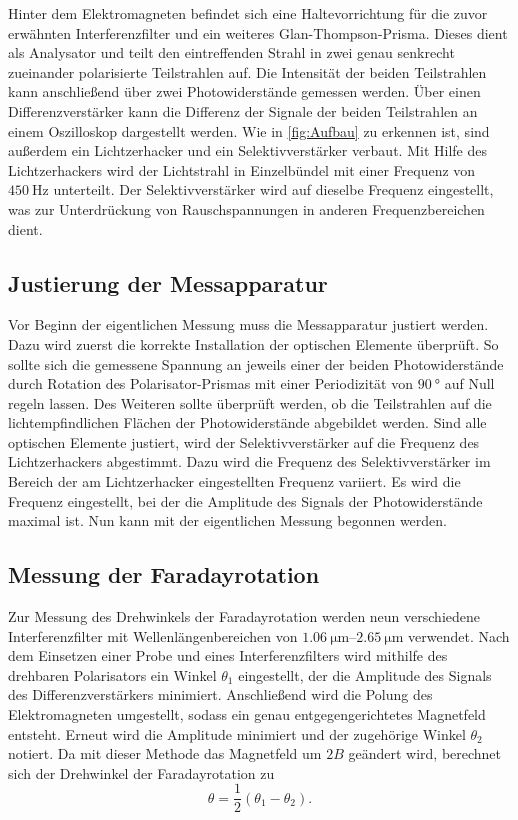 Hinter dem Elektromagneten befindet sich eine Haltevorrichtung für die zuvor erwähnten Interferenzfilter und ein weiteres Glan-Thompson-Prisma. Dieses dient als 
Analysator und teilt den eintreffenden Strahl in zwei genau senkrecht zueinander polarisierte Teilstrahlen auf. Die Intensität der beiden Teilstrahlen kann anschließend 
über zwei Photowiderstände gemessen werden. Über einen Differenzverstärker kann die Differenz der Signale der beiden Teilstrahlen an einem 
Oszilloskop dargestellt werden. Wie in \autoref{fig:Aufbau} zu erkennen ist, sind außerdem ein \glqq Lichtzerhacker\grqq{} und ein Selektivverstärker verbaut. 
Mit Hilfe des Lichtzerhackers wird der Lichtstrahl in Einzelbündel mit einer Frequenz von $\qty{450}{\hertz}$ unterteilt. Der Selektivverstärker wird auf dieselbe 
Frequenz eingestellt, was zur Unterdrückung von Rauschspannungen in anderen Frequenzbereichen dient.

\subsection{Justierung der Messapparatur}
Vor Beginn der eigentlichen Messung muss die Messapparatur justiert werden. Dazu wird zuerst die korrekte Installation der optischen Elemente überprüft. 
So sollte sich die gemessene Spannung an jeweils einer der beiden Photowiderstände durch Rotation des Polarisator-Prismas mit einer Periodizität von $\qty{90}{\degree}$ 
auf Null regeln lassen. Des Weiteren sollte überprüft werden, ob die Teilstrahlen auf die lichtempfindlichen Flächen der Photowiderstände abgebildet werden. 
Sind alle optischen Elemente justiert, wird der Selektivverstärker auf die Frequenz des Lichtzerhackers abgestimmt. Dazu wird die Frequenz des Selektivverstärker 
im Bereich der am Lichtzerhacker eingestellten Frequenz variiert. Es wird die Frequenz eingestellt, bei der die Amplitude des Signals der Photowiderstände maximal ist.
Nun kann mit der eigentlichen Messung begonnen werden.

\subsection{Messung der Faradayrotation}
\label{subsec:Messung der Faradayrotation}
Zur Messung des Drehwinkels der Faradayrotation werden neun verschiedene Interferenzfilter mit Wellenlängenbereichen von $\qtyrange{1.06}{2.65}{\micro\metre}$ verwendet.
Nach dem Einsetzen einer Probe und eines Interferenzfilters wird mithilfe des drehbaren Polarisators ein Winkel $\theta_1$ eingestellt, der die Amplitude des Signals des 
Differenzverstärkers 
minimiert. Anschließend wird die Polung des Elektromagneten umgestellt, sodass ein genau entgegengerichtetes Magnetfeld entsteht. Erneut wird die Amplitude minimiert und der 
zugehörige Winkel $\theta_2$ notiert. Da mit dieser Methode das Magnetfeld um $2B$ geändert wird, berechnet sich der Drehwinkel der Faradayrotation zu 
\begin{equation}
    \label{eqn:theta_diff}
    \theta = \frac{1}{2}(\theta_1 -\theta_2).
\end{equation}

